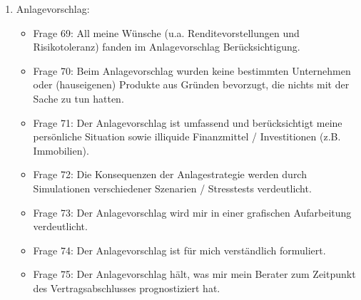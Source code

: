 \documentclass{article}\usepackage[]{graphicx}\usepackage[]{color}
\begin{document}
\begin{enumerate}


    \item Anlagevorschlag:
    \begin{itemize}
    \item Frage 69: 
    All meine Wünsche (u.a. Renditevorstellungen und Risikotoleranz) fanden im Anlagevorschlag Berücksichtigung.
    \item Frage 70: 
    Beim Anlagevorschlag wurden keine bestimmten Unternehmen oder (hauseigenen) Produkte aus Gründen bevorzugt, die nichts mit der Sache zu tun hatten.
    \item Frage 71: 
    Der Anlagevorschlag ist umfassend und berücksichtigt meine persönliche Situation sowie illiquide Finanzmittel / Investitionen (z.B. Immobilien).
    \item Frage 72:
    Die Konsequenzen der Anlagestrategie werden durch Simulationen verschiedener Szenarien / Stresstests verdeutlicht.
    \item Frage 73:
    Der Anlagevorschlag wird mir in einer grafischen Aufarbeitung verdeutlicht.
    \item Frage 74:
    Der Anlagevorschlag ist für mich verständlich formuliert.
    \item Frage 75:
    Der Anlagevorschlag hält, was mir mein Berater zum Zeitpunkt des Vertragsabschlusses prognostiziert hat.
    \end{itemize}
    


\end{enumerate}
\end{document}
